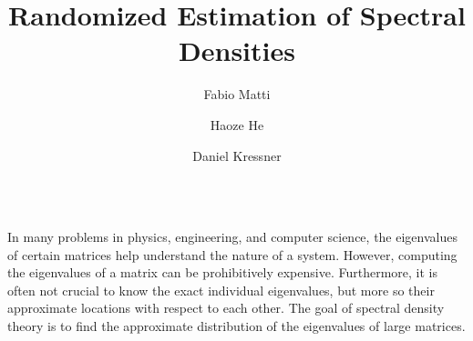 \documentclass[final, leqno, 12pt]{beamer}
\title{Randomized Estimation of Spectral Densities}
\author{Fabio Matti \and Haoze He \and Daniel Kressner}
\institute[shortinst]{ANCHP, École polytechnique fédérale de Lausanne (EPFL), Lausanne, Switzerland}
\begin{document}

\begin{frame}[t]
\vspace{-20pt}
\begin{columns}[t]
\begin{column}{0.85\paperwidth}
\vspace{-40pt}
    \justify
    In many problems in physics, engineering, and computer science, 
    the eigenvalues of certain matrices help understand the nature of a system.
    However, computing the eigenvalues of a matrix can be prohibitively expensive.
    Furthermore, it is often not crucial to know the exact individual eigenvalues,
    but more so their approximate locations with respect to each other.
    The goal of spectral density theory is to find the approximate distribution of
    the eigenvalues of large matrices.
\vspace{20pt}
\end{column}
\end{columns}


\begin{columns}[t]

    \begin{column}{0.45\paperwidth}


\end{column}
\end{columns}
\end{frame}
\end{document}
